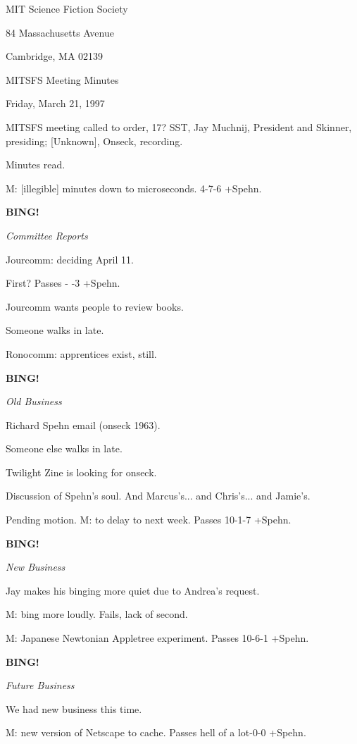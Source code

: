 \documentclass[12pt]{article}
\newcommand{\bing}{{\bf BING!} }
\newcommand{\goto}[1]{\bing \vskip 12pt \centerline{{\em{#1}}}}
\begin{document}
\begin{center}

MIT Science Fiction Society 

84 Massachusetts Avenue

Cambridge, MA 02139

\vspace{12pt}

MITSFS Meeting Minutes 

Friday, March 21, 1997

\end{center}
 
\vspace{18pt}

\setlength{\parskip}{6pt}

\noindent
MITSFS meeting called to order, 17? SST,
Jay Muchnij, President and Skinner, presiding; [Unknown], Onseck, recording.

Minutes read.

M: [illegible] minutes down to microseconds. 4-7-6 +Spehn.

\goto{Committee Reports}

Jourcomm: deciding April 11.

First? Passes  - -3 +Spehn.

Jourcomm wants people to review books.

Someone walks in late.

Ronocomm: apprentices exist, still.

\goto{Old Business}

Richard Spehn email (onseck 1963).

Someone else walks in late.

Twilight Zine is looking for onseck.

Discussion of Spehn's soul. And Marcus's... and Chris's... and Jamie's.

Pending motion. M: to delay to next week. Passes 10-1-7 +Spehn.

\goto{New Business}

Jay makes his binging more quiet due to Andrea's request.

M: bing more loudly. Fails, lack of second.

M: Japanese Newtonian Appletree experiment. Passes 10-6-1 +Spehn.

\goto{Future Business}

We had new business this time.

M: new version of Netscape to cache. Passes hell of a lot-0-0 +Spehn.
\end{document}
